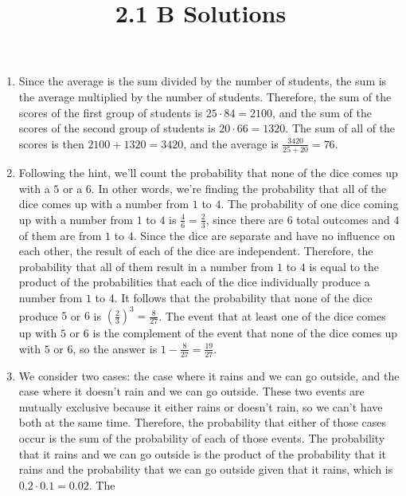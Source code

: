 \documentclass{article}
\title{2.1 B Solutions}
\author{}
\date{}
\begin{document}
\maketitle

\begin{enumerate}
    \item Since the average is the sum divided by the number of students, the 
        sum is the average multiplied by the number of students. Therefore, the 
        sum of the scores of the first group of students is $25 \cdot 84 = 
        2100$, and the sum of the scores of the second group of students is $20 
        \cdot 66 = 1320$. The sum of all of the scores is then $2100 + 1320 = 
        3420$, and the average is $\frac{3420}{25 + 20} = 76$.
    \item Following the hint, we'll count the probability that none of the dice 
        comes up with a $5$ or a $6$. In other words, we're finding the 
        probability that all of the dice comes up with a number from $1$ to $4$.  
        The probability of one dice coming up with a number from $1$ to $4$ is 
        $\frac{4}{6} = \frac{2}{3}$, since there are $6$ total outcomes and $4$ 
        of them are from $1$ to $4$. Since the dice are separate and have no 
        influence on each other, the result of each of the dice are independent.  
        Therefore, the probability that all of them result in a number from $1$ 
        to $4$ is equal to the product of the probabilities that each of the 
        dice individually produce a number from $1$ to $4$. It follows that the 
        probability that none of the dice produce $5$ or $6$ is 
        $\left(\frac{2}{3}\right)^3 = \frac{8}{27}$. The event that at least one 
        of the dice comes up with $5$ or $6$ is the complement of the event that 
        none of the dice comes up with $5$ or $6$, so the answer is $1 - 
        \frac{8}{27} = \frac{19}{27}$.
    \item We consider two cases: the case where it rains and we can go outside, 
        and the case where it doesn't rain and we can go outside. These two 
        events are mutually exclusive because it either rains or doesn't rain, 
        so we can't have both at the same time. Therefore, the probability that 
        either of those cases occur is the sum of the probability of each of 
        those events. The probability that it rains and we can go outside is the 
        product of the probability that it rains and the probability that we can 
        go outside given that it rains, which is $0.2 \cdot 0.1 = 0.02$. The 

\end{enumerate}
\end{document}
